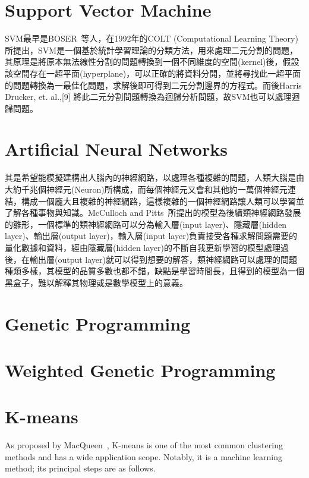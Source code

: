 \section{Support Vector Machine}

SVM最早是BOSER~\cite{boser1992}等人，在1992年的COLT (Computational Learning Theory)所提出，SVM是一個基於統計學習理論的分類方法，用來處理二元分割的問題，其原理是將原本無法線性分割的問題轉換到一個不同維度的空間(kernel)後，假設該空間存在一超平面(hyperplane)，可以正確的將資料分開，並將尋找此一超平面的問題轉換為一最佳化問題，求解後即可得到二元分割邊界的方程式。而後Harris Drucker, et. al.,[9] 將此二元分割問題轉換為迴歸分析問題，故SVM也可以處理迴歸問題。

\section{Artificial Neural Networks}

其是希望能模擬建構出人腦內的神經網路，以處理各種複雜的問題，人類大腦是由大約千兆個神經元(Neuron)所構成，而每個神經元又會和其他約一萬個神經元連結，構成一個龐大且複雜的神經網路，這樣複雜的一個神經網路讓人類可以學習並了解各種事物與知識。McCulloch and Pitts~\cite{mcculloch1943logical}所提出的模型為後續類神經網路發展的雛形，一個標準的類神經網路可以分為輸入層(input layer)、隱藏層(hidden layer)、輸出層(output layer)，輸入層(input layer)負責接受各種求解問題需要的量化數據和資料，經由隱藏層(hidden layer)的不斷自我更新學習的模型處理過後，在輸出層(output layer)就可以得到想要的解答，類神經網路可以處理的問題種類多樣，其模型的品質多數也都不錯，缺點是學習時間長，且得到的模型為一個黑盒子，難以解釋其物理或是數學模型上的意義。

\section{Genetic Programming}



\section{Weighted Genetic Programming}



\section{K-means}

As proposed by MacQueen~\cite{macqueen67}, K-means is one of the most common clustering methods and has a wide application scope. Notably, it is a machine learning method; its principal steps are as follows.

